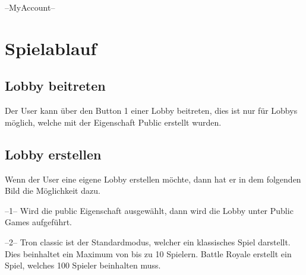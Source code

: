 \documentclass[11pt,ngerman]{article}
\begin{document}
    --MyAccount--
    
    \section{Spielablauf}
    
    
    \subsection{Lobby beitreten}
    
    Der User kann über den Button 1 einer Lobby beitreten, dies ist nur für Lobbys möglich, welche mit der Eigenschaft Public erstellt wurden.
    
    
    \subsection{Lobby erstellen}
    
    Wenn der User eine eigene Lobby erstellen möchte, dann hat er in dem folgenden Bild die Möglichkeit dazu.
    
    
    --1-- Wird die public Eigenschaft ausgewählt, dann wird die Lobby unter Public Games aufgeführt. 
    
    --2-- Tron classic ist der Standardmodus, welcher ein klassisches Spiel darstellt. Dies beinhaltet ein Maximum von bis zu 10 Spielern. Battle Royale erstellt ein Spiel, welches 100 Spieler beinhalten muss.
    
\end{document}
